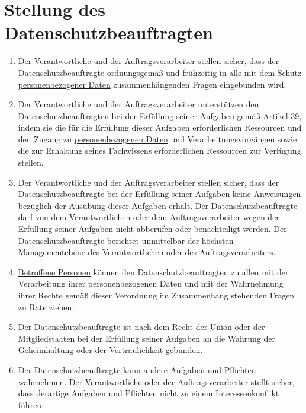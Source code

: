 \chapter{Stellung des Datenschutzbeauftragten}
\label{ch:38}


\begin{enumerate}

  \item Der Verantwortliche und der Auftragsverarbeiter stellen sicher, dass der Datenschutzbeauftragte ordnungsgemäß
   und frühzeitig in alle mit dem Schutz \hyperref[itm:04-1]{personenbezogener Daten} zusammenhängenden Fragen eingebunden wird.
  \label{itm:38-1}

  \item Der Verantwortliche und der Auftragsverarbeiter unterstützen den Datenschutzbeauftragten bei der Erfüllung
   seiner Aufgaben gemäß \hyperref[ch:39]{Artikel 39}, indem sie die für die Erfüllung dieser Aufgaben erforderlichen
   Ressourcen und den Zugang zu \hyperref[itm:04-1]{personenbezogenen Daten} und Verarbeitungsvorgängen sowie die zur Erhaltung seines
   Fachwissens erforderlichen Ressourcen zur Verfügung stellen.
  \label{itm:38-2}

  \item Der Verantwortliche und der Auftragsverarbeiter stellen sicher, dass der Datenschutzbeauftragte bei der
   Erfüllung seiner Aufgaben keine Anweisungen bezüglich der Ausübung dieser Aufgaben erhält. Der
   Datenschutzbeauftragte darf von dem Verantwortlichen oder dem Auftragsverarbeiter wegen der Erfüllung seiner
   Aufgaben nicht abberufen oder benachteiligt werden. Der Datenschutzbeauftragte berichtet unmittelbar der höchsten
   Managementebene des Verantwortlichen oder des Auftragsverarbeiters.
  \label{itm:38-3}

  \item \hyperref[itm:04-1]{Betroffene Personen} können den Datenschutzbeauftragten zu allen mit der Verarbeitung ihrer personenbezogenen
   Daten und mit der Wahrnehmung ihrer Rechte gemäß dieser Verordnung im Zusammenhang stehenden Fragen zu Rate ziehen.
  \label{itm:38-4}

  \item Der Datenschutzbeauftragte ist nach dem Recht der Union oder der Mitgliedstaaten bei der Erfüllung seiner
   Aufgaben an die Wahrung der Geheimhaltung oder der Vertraulichkeit gebunden.
  \label{itm:38-5}

  \item Der Datenschutzbeauftragte kann andere Aufgaben und Pflichten wahrnehmen. Der Verantwortliche oder der
   Auftragsverarbeiter stellt sicher, dass derartige Aufgaben und Pflichten nicht zu einem Interessenkonflikt führen.
  \label{itm:38-6}

\end{enumerate}


